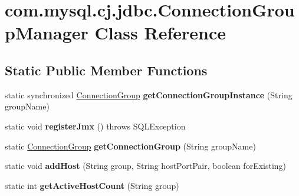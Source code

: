 \hypertarget{classcom_1_1mysql_1_1cj_1_1jdbc_1_1_connection_group_manager}{}\section{com.\+mysql.\+cj.\+jdbc.\+Connection\+Group\+Manager Class Reference}
\label{classcom_1_1mysql_1_1cj_1_1jdbc_1_1_connection_group_manager}
\subsection*{Static Public Member Functions}
\begin{DoxyCompactItemize}
\item 
\mbox{\label{classcom_1_1mysql_1_1cj_1_1jdbc_1_1_connection_group_manager_ad20f5bdc74ab930e93fb687718f5be3d}} 
static synchronized \mbox{\hyperlink{classcom_1_1mysql_1_1cj_1_1jdbc_1_1_connection_group}{Connection\+Group}} {\bfseries get\+Connection\+Group\+Instance} (String group\+Name)
\item 
\mbox{\label{classcom_1_1mysql_1_1cj_1_1jdbc_1_1_connection_group_manager_ac045989c3b6ddad6154fef6b04bb34b6}} 
static void {\bfseries register\+Jmx} ()  throws S\+Q\+L\+Exception 
\item 
\mbox{\label{classcom_1_1mysql_1_1cj_1_1jdbc_1_1_connection_group_manager_a0a780ce6ad7aeb4b54bdafadaa41548e}} 
static \mbox{\hyperlink{classcom_1_1mysql_1_1cj_1_1jdbc_1_1_connection_group}{Connection\+Group}} {\bfseries get\+Connection\+Group} (String group\+Name)
\item 
\mbox{\label{classcom_1_1mysql_1_1cj_1_1jdbc_1_1_connection_group_manager_a63735dc43c2b4813bf7f9643abd06aad}} 
static void {\bfseries add\+Host} (String group, String host\+Port\+Pair, boolean for\+Existing)
\item 
\mbox{\label{classcom_1_1mysql_1_1cj_1_1jdbc_1_1_connection_group_manager_a3d5af875c1074d121ad1f31cb2bbd7eb}} 
static int {\bfseries get\+Active\+Host\+Count} (String group)

\end{DoxyCompactItemize}
